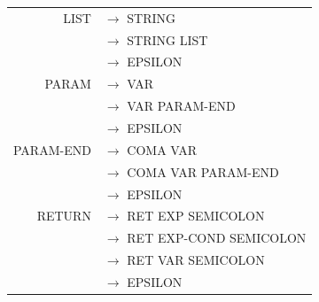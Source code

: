 \documentclass[a4paper,10pt]{article}
\begin{document}
\begin{tabular}{rl}
LIST				& $\rightarrow$ STRING \\
					& $\rightarrow$ STRING LIST\\
					& $\rightarrow$ EPSILON\\
				

					
PARAM				& $\rightarrow$ VAR \\
					& $\rightarrow$ VAR PARAM-END\\
					& $\rightarrow$ EPSILON \\
PARAM-END			& $\rightarrow$ COMA VAR \\ 
					& $\rightarrow$ COMA VAR PARAM-END\\ 
					& $\rightarrow$ EPSILON \\

RETURN				& $\rightarrow$ RET EXP SEMICOLON\\
					& $\rightarrow$ RET EXP-COND SEMICOLON\\
					& $\rightarrow$ RET VAR SEMICOLON\\
					& $\rightarrow$ EPSILON \\
					



					
					
\end{tabular}

~\\
\end{document}
